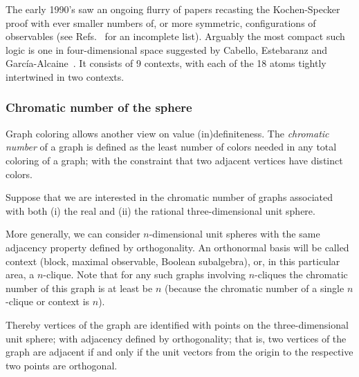 The early 1990's saw an ongoing flurry of papers recasting the Kochen-Specker proof with ever smaller numbers of,
or more symmetric, configurations of
observables
(see Refs.~\cite{peres-91,penrose-ks,Peres:1996fk,Kernaghan-1994,mermin-93,bub,svozil-tkadlec,tkadlec-96,cabello-96,Cabello-1996ega,CalHerSvo-tatra,tkadlec-00,tkadlec-01,pavicic:inria-00070615,Smith-2004,Pavicic-2005,Arends2011,Waegell-2011,1751-8121-44-50-505303,Planat2012,PhysRevLett.108.030402,Cabello-2014-PhysRevA.89.042101} for an incomplete list).
Arguably the most compact such logic is one in four-dimensional space suggested by Cabello, Estebaranz and Garc{\'{i}}a-Alcaine~\cite{cabello-96,cabello-99,Pavicic-2005}.
It consists of 9 contexts, with each of the 18 atoms tightly intertwined in two contexts.



\subsubsection{Chromatic number of the sphere}

Graph coloring allows another view on value (in)definiteness.
The {\em chromatic number} of a graph
is defined as the least number of colors needed in any total coloring of a graph;
with the constraint that two adjacent vertices have distinct colors.

Suppose that we are interested in the chromatic number of graphs associated with
both (i) the real and (ii) the rational three-dimensional unit sphere.

More generally, we can consider $n$-dimensional unit spheres with the same adjacency property defined by orthogonality.
An orthonormal basis will be called context (block, maximal observable, Boolean subalgebra),
or, in this particular area, a $n$-clique.
Note that for any such graphs involving $n$-cliques the chromatic number of this graph is at least be $n$
(because the chromatic number of a single $n$-clique or context is $n$).

Thereby vertices of the graph are identified with points on the three-dimensional unit sphere;
with adjacency  defined by orthogonality; that is,
two vertices of the graph are adjacent if and only if the unit vectors from the origin
to the respective two points are orthogonal.

